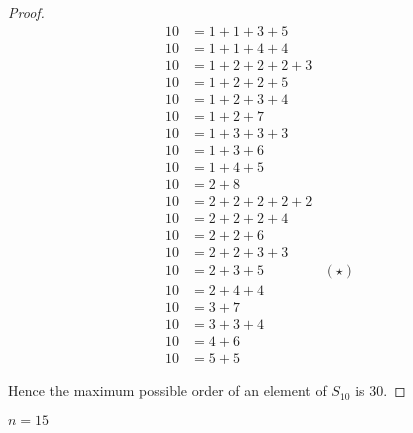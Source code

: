 \begin{proof}
\begin{align*}
        10 & = 1 + 1 + 3 + 5                                   \\
        10 & = 1 + 1 + 4 + 4                                   \\
        10 & = 1 + 2 + 2 + 2 + 3                               \\
        10 & = 1 + 2 + 2 + 5                                   \\
        10 & = 1 + 2 + 3 + 4                                   \\
        10 & = 1 + 2 + 7                                       \\
        10 & = 1 + 3 + 3 + 3                                   \\
        10 & = 1 + 3 + 6                                       \\
        10 & = 1 + 4 + 5                                       \\
        10 & = 2 + 8                                           \\
        10 & = 2 + 2 + 2 + 2 + 2                               \\
        10 & = 2 + 2 + 2 + 4                                   \\
        10 & = 2 + 2 + 6                                       \\
        10 & = 2 + 2 + 3 + 3                                   \\
        10 & = 2 + 3 + 5                             & (\star) \\
        10 & = 2 + 4 + 4                                       \\
        10 & = 3 + 7                                           \\
        10 & = 3 + 3 + 4                                       \\
        10 & = 4 + 6                                           \\
        10 & = 5 + 5
    \end{align*}

    Hence the maximum possible order of an element of $S_{10}$ is $30$.
\end{proof}

\begin{exercise}
    $n = 15$
\end{exercise}

